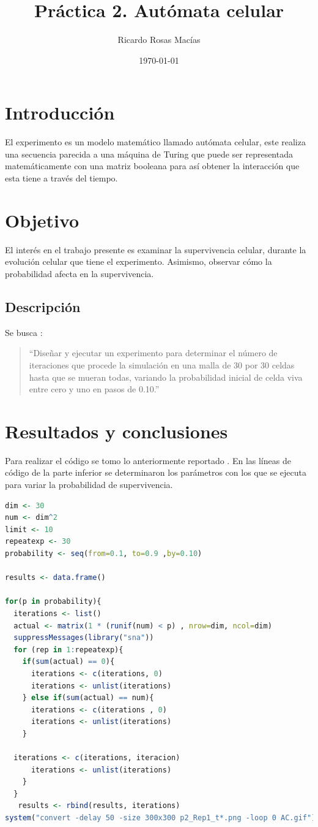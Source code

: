 \documentclass[12pt, letterpaper] {article}
\author{Ricardo Rosas Macías}
\title{Práctica 2. Autómata celular}
\date{\today}
\begin{document}
\maketitle



\section{Introducción}

El experimento es un modelo matemático llamado autómata celular, este realiza una secuencia parecida a una máquina de Turing que puede ser representada matemáticamente con una matriz booleana para así obtener la interacción que esta tiene a  través del tiempo. 

 \section{Objetivo}
El interés en el trabajo presente es examinar la supervivencia celular, durante la evolución celular que tiene el experimento. Asimismo, observar cómo la probabilidad afecta en la supervivencia.

 \subsection{Descripción}

Se busca \cite{elisawebAC}:
\begin{quotation}
 ``Diseñar y ejecutar un experimento para determinar el número de iteraciones que procede la simulación en una malla de 30 por 30 celdas hasta que se mueran todas, variando la probabilidad inicial de celda viva entre cero y uno en pasos de 0.10.''
\end{quotation}

\section{Resultados y conclusiones}

Para realizar el código se  tomo lo anteriormente reportado \cite{MPP2}\cite{EP2}. En las líneas de código de la parte inferior se determinaron los parámetros con los que se ejecuta para variar la probabilidad de supervivencia.

\begin{lstlisting}[language=R]
dim <- 30
num <- dim^2
limit <- 10
repeatexp <- 30
probability <- seq(from=0.1, to=0.9 ,by=0.10)

results <- data.frame()

for(p in probability){
  iterations <- list()
  actual <- matrix(1 * (runif(num) < p) , nrow=dim, ncol=dim)
  suppressMessages(library("sna"))
  for (rep in 1:repeatexp){
    if(sum(actual) == 0){ 
      iterations <- c(iterations, 0)
      iterations <- unlist(iterations)
    } else if(sum(actual) == num){
      iterations <- c(iterations , 0)
      iterations <- unlist(iterations)
    } 

  iterations <- c(iterations, iteracion)
      iterations <- unlist(iterations)
    }
  }
   results <- rbind(results, iterations)
system("convert -delay 50 -size 300x300 p2_Rep1_t*.png -loop 0 AC.gif") 
\end{lstlisting}
\end{document}
